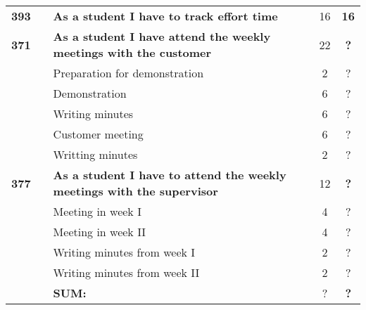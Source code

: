 \begin{longtable}{ccXcc}
\midrule

\textbf{393} 	& 
	& {\bf  As a student I have to track effort time} 	& 		16	& \textbf{16} \\		

\textbf{371} 	& 
	& {\bf As a student I have attend the weekly meetings with the customer} 	
	& 	22	
	& \textbf{?} \\
		&& Preparation for demonstration	& 2 & ? \\
		&& Demonstration	& 6 & ? \\
		&& Writing minutes 	&  6 & ? \\	
		&& Customer meeting	&  6 & ? \\
		&& Writting minutes	&  2 & ? \\
		
\textbf{377} 	& 
	& {\bf As a student I have to attend the weekly meetings with the supervisor} 	
	& 	12	
	& \textbf{?} \\
		&& Meeting in week I	& 4 & ? \\
		&& Meeting in week II	& 4 & ? \\
		&& Writing minutes from week I 	&  2 & ? \\
		&& Writing minutes from week II	&  2 & ? \\	
	
				
\hline
				&& \textbf{SUM:}		&		?	& \textbf{?}\\																			
\bottomrule[1mm]
\end{longtable}